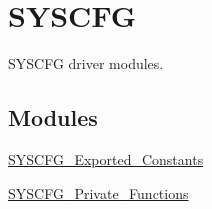 \hypertarget{group___s_y_s_c_f_g}{\section{S\-Y\-S\-C\-F\-G}
\label{group___s_y_s_c_f_g}
}


S\-Y\-S\-C\-F\-G driver modules.  


\subsection*{Modules}
\begin{DoxyCompactItemize}
\item 
\hyperlink{group___s_y_s_c_f_g___exported___constants}{S\-Y\-S\-C\-F\-G\-\_\-\-Exported\-\_\-\-Constants}
\item 
\hyperlink{group___s_y_s_c_f_g___private___functions}{S\-Y\-S\-C\-F\-G\-\_\-\-Private\-\_\-\-Functions}
\end{DoxyCompactItemize}

